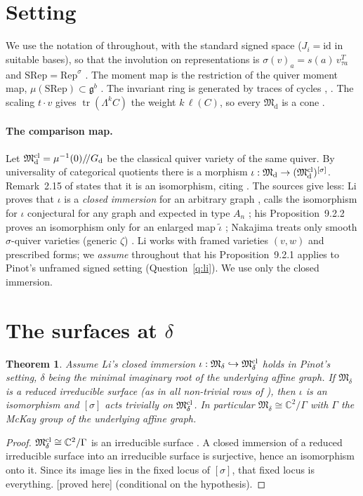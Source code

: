 \documentclass[11pt]{article}
\newtheorem{theorem}{Theorem}[section]
\theoremstyle{definition}
\theoremstyle{remark}
\newcommand{\tagP}{\textsf{\small[proved here]}}
\newcommand{\C}{\mathbb{C}}\newcommand{\R}{\mathbb{R}}\newcommand{\Z}{\mathbb{Z}}
\newcommand{\M}{\mathfrak{M}}\newcommand{\Rep}{\mathrm{Rep}}\newcommand{\SRep}{\mathrm{SRep}}
\begin{document}
\section{Setting}\label{sec:setup}
We use the notation of \cite{Pinot} throughout, with the standard signed space ($J_i=\mathrm{id}$ in suitable bases), so that the involution on representations is $\sigma(v)_a=s(a)\,v_{\tau a}^{T}$ and $\SRep=\Rep^\sigma$ \cite[Def.~2.3, 2.5]{Pinot}. The moment map is the restriction of the quiver moment map, $\mu(\SRep)\subset\mathfrak g^b$ \cite[Cor.~2.13]{Pinot}. The invariant ring is generated by traces of cycles \cite[Thm.~3.9]{Pinot}, \cite{LP90}. The scaling $t\cdot v$ gives $\operatorname{tr}(\Lambda^kC)$ the weight $k\,\ell(C)$, so every $\M_{\mathrm d}$ is a cone \cite[\S3.5.1]{Pinot}.

\paragraph{The comparison map.} Let $\M^{\rm cl}_{\mathrm d}=\mu^{-1}(0)/\!/G_{\mathrm d}$ be the classical quiver variety of the same quiver. By universality of categorical quotients there is a morphism $\iota:\M_{\mathrm d}\to(\M^{\rm cl}_{\mathrm d})^{[\sigma]}$. Remark~2.15 of \cite{Pinot} states that it is an isomorphism, citing \cite{Li19,Nak25}. The sources give less: Li proves that $\iota$ is a \emph{closed immersion} for an arbitrary graph \cite[Prop.~9.2.1]{Li19}, calls the isomorphism for $\iota$ conjectural for any graph and expected in type $A_n$ \cite[Rem.~9.2.3]{Li19}; his Proposition~9.2.2 proves an isomorphism only for an enlarged map $\tilde\iota$ \cite[Prop.~9.2.2]{Li19}; Nakajima treats only smooth $\sigma$-quiver varieties (generic $\zeta$) \cite{Nak25}. Li works with framed varieties $(v,w)$ and prescribed forms; we \emph{assume} throughout that his Proposition~9.2.1 applies to Pinot's unframed signed setting (Question~\ref{q:li}). We use only the closed immersion.

\section{The surfaces at $\delta$}\label{sec:delta}

\begin{theorem}\label{thm:A}
Assume Li's closed immersion $\iota:\M_\delta\hookrightarrow\M^{\rm cl}_\delta$ holds in Pinot's setting, $\delta$ being the minimal imaginary root of the underlying affine graph. If $\M_\delta$ is a reduced irreducible surface (as in all non-trivial rows of \cite[Thm.~1.2]{Pinot}), then $\iota$ is an isomorphism and $[\sigma]$ acts trivially on $\M^{\rm cl}_\delta$. In particular $\M_\delta\cong\C^2/\Gamma$ with $\Gamma$ the McKay group of the underlying affine graph.
\end{theorem}
\begin{proof}
$\M^{\rm cl}_\delta\cong\C^2/\Gamma$ is an irreducible surface \cite{Kron,Nak94}. A closed immersion of a reduced irreducible surface into an irreducible surface is surjective, hence an isomorphism onto it. Since its image lies in the fixed locus of $[\sigma]$, that fixed locus is everything. \tagP{} (conditional on the hypothesis).
\end{proof}
\end{document}
